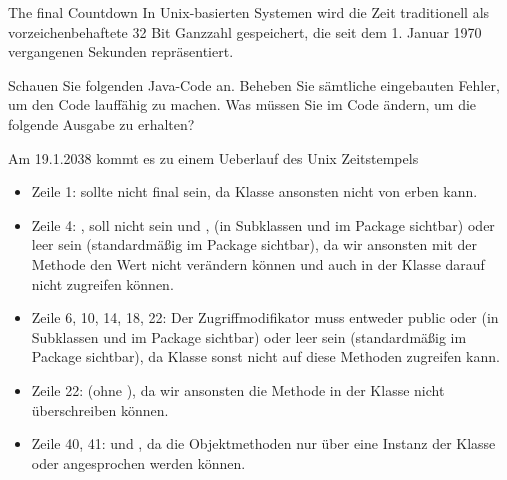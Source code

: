 \documentclass{../tuda-exercise}
\begin{document}
  \begin{task}[credit=\stars{3}{3}]{The final Countdown}
    In Unix-basierten Systemen wird die Zeit traditionell als vorzeichenbehaftete 32 Bit Ganzzahl
    gespeichert, die seit dem 1. Januar 1970 vergangenen Sekunden repräsentiert.

    \br

    Schauen Sie folgenden Java-Code an. Beheben Sie sämtliche eingebauten Fehler, um den Code
    lauffähig zu machen. Was müssen Sie im Code ändern, um die folgende Ausgabe zu erhalten?

    \br

    \begin{center}
      \textcolor{stringcolor}{\grqq Am 19.1.2038 kommt es zu einem Ueberlauf des Unix
      Zeitstempels\grqq}
    \end{center}

    \clearpage

    

    \clearpagesolution

    \begin{solution}
      

      \clearpage

      \begin{itemize}
        \item Zeile 1:  sollte nicht \textcolor{keywordcolor}{final}
        sein, da Klasse  ansonsten nicht von  erben kann.
        \item Zeile 4: , soll nicht  sein und
        ,  (in Subklassen und im Package sichtbar) oder
        leer sein (standardmäßig im Package sichtbar), da wir ansonsten mit der Methode
         den Wert nicht verändern können und auch in der Klasse
         darauf nicht zugreifen können.
        \item Zeile 6, 10, 14, 18, 22: Der Zugriffmodifikator muss entweder
        \textcolor{keywordcolor}{public} oder  (in Subklassen und im
        Package sichtbar) oder leer sein (standardmäßig im Package sichtbar), da Klasse
         sonst nicht auf diese Methoden zugreifen kann.
        \item Zeile 22:  (ohne ), da wir ansonsten die
        Methode in der Klasse  nicht überschreiben können.
        \item Zeile 40, 41:  und , da die
        Objektmethoden nur über eine Instanz der Klasse  oder 
        angesprochen werden können.
      \end{itemize}


\end{solution}
\end{task}
\end{document}
